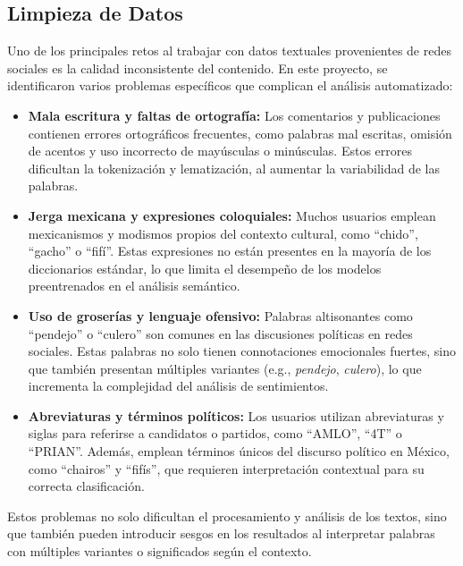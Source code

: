 \documentclass[10pt, a4paper]{article}
\begin{document}
	\subsection{Limpieza de Datos}
	
	Uno de los principales retos al trabajar con datos textuales provenientes de redes sociales es la calidad inconsistente del contenido. En este proyecto, se identificaron varios problemas específicos que complican el análisis automatizado:
	
	\begin{itemize}
		\item \textbf{Mala escritura y faltas de ortografía:} Los comentarios y publicaciones contienen errores ortográficos frecuentes, como palabras mal escritas, omisión de acentos y uso incorrecto de mayúsculas o minúsculas. Estos errores dificultan la tokenización y lematización, al aumentar la variabilidad de las palabras.
		
		\item \textbf{Jerga mexicana y expresiones coloquiales:} Muchos usuarios emplean mexicanismos y modismos propios del contexto cultural, como “chido”, “gacho” o “fifí”. Estas expresiones no están presentes en la mayoría de los diccionarios estándar, lo que limita el desempeño de los modelos preentrenados en el análisis semántico.
		
		\item \textbf{Uso de groserías y lenguaje ofensivo:} Palabras altisonantes como “pendejo” o “culero” son comunes en las discusiones políticas en redes sociales. Estas palabras no solo tienen connotaciones emocionales fuertes, sino que también presentan múltiples variantes (e.g., \textit{pendejo}, \textit{culero}), lo que incrementa la complejidad del análisis de sentimientos.
		
		\item \textbf{Abreviaturas y términos políticos:} Los usuarios utilizan abreviaturas y siglas para referirse a candidatos o partidos, como “AMLO”, “4T” o “PRIAN”. Además, emplean términos únicos del discurso político en México, como “chairos” y “fifís”, que requieren interpretación contextual para su correcta clasificación.
		
	\end{itemize}
	
	Estos problemas no solo dificultan el procesamiento y análisis de los textos, sino que también pueden introducir sesgos en los resultados al interpretar palabras con múltiples variantes o significados según el contexto.
	
\end{document}
